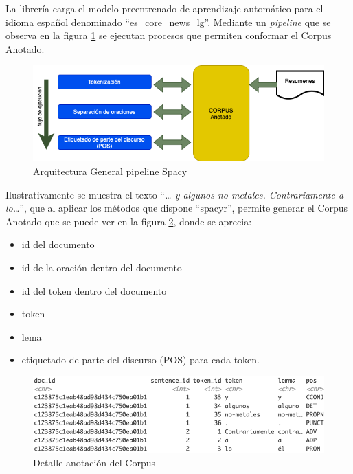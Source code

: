 \documentclass[
  12pt,
  openany]{book}
\begin{document}
La librería carga el modelo preentrenado de aprendizaje automático para el idioma español denominado ``es\_core\_news\_lg''. Mediante un \emph{pipeline} que se observa en la figura \ref{fig:spacypi} se ejecutan procesos que permiten conformar el Corpus Anotado.

\begin{figure}

{\centering \includegraphics[width=0.8\linewidth]{images/05-desarrollo/2_ciclo/nlp/spacy_pipeline1} 

}

\caption{Arquitectura General pipeline Spacy}\label{fig:spacypi}
\end{figure}

Ilustrativamente se muestra el texto ``\emph{\ldots{} y algunos no-metales. Contrariamente a lo\ldots{}}'', que al aplicar los métodos que dispone ``spacyr'', permite generar el Corpus Anotado que se puede ver en la figura \ref{fig:corpusano}, donde se aprecia:

\begin{itemize}
\item
  id del documento
\item
  id de la oración dentro del documento
\item
  id del token dentro del documento
\item
  token
\item
  lema
\item
  etiquetado de parte del discurso (POS) para cada token.
\end{itemize}

\begin{figure}

{\centering \includegraphics[width=0.9\linewidth]{images/05-desarrollo/2_ciclo/nlp/corpusanotado2} 

}

\caption{Detalle anotación del Corpus}\label{fig:corpusano}
\end{figure}
\end{document}
